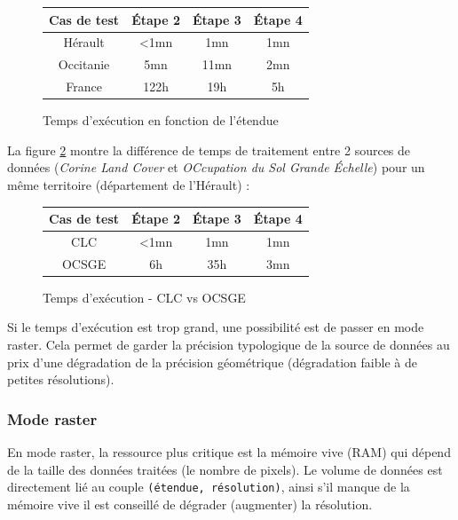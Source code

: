 \documentclass[11pt]{article}
\begin{document}
\begin{figure}[h!]
\begin{center}
\begin{tabular}{|c|ccc|}
    \hline
    Cas de test & Étape 2 & Étape 3 & Étape 4\\
    \hline
    Hérault & <1mn & 1mn & 1mn \\
    Occitanie & 5mn & 11mn & 2mn \\
    France & 122h & 19h & 5h \\
    \hline
\end{tabular}
\end{center}
\vspace*{-0.5cm}
\caption{Temps d'exécution en fonction de l'étendue}
\label{fig:benchCLC}
\end{figure}

La figure \ref{fig:benchOS} montre la différence de temps de traitement entre 2 sources de données (\emph{Corine Land Cover} et \emph{OCcupation du Sol Grande Échelle}) pour un même territoire (département de l'Hérault) :

\begin{figure}[h!]
\begin{center}
\begin{tabular}{|c|ccc|}
    \hline
    Cas de test & Étape 2 & Étape 3 & Étape 4\\
    \hline
    CLC & <1mn & 1mn & 1mn \\
    OCSGE & 6h & 35h & 3mn \\
    \hline
\end{tabular}
\end{center}
\vspace*{-0.5cm}
\caption{Temps d'exécution - CLC vs OCSGE}
\label{fig:benchOS}
\end{figure}

Si le temps d'exécution est trop grand, une possibilité est de passer en mode raster. Cela permet de garder la précision typologique de la source de données au prix d'une dégradation de la précision géométrique (dégradation faible à de petites résolutions).

\subsubsection{Mode raster}

En mode raster, la ressource plus critique est la mémoire vive (RAM) qui dépend de la taille des données traitées (le nombre de pixels). Le volume de données est directement lié au couple \texttt{(étendue,  résolution)}, ainsi s'il manque de la mémoire vive il est conseillé de dégrader (augmenter) la résolution.
\end{document}
